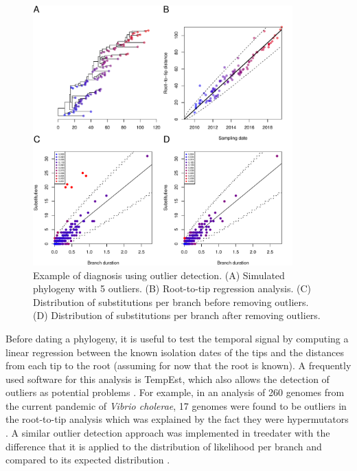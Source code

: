 \documentclass{article}
\begin{document}
\begin{figure}[p!]
\begin{center}
\includegraphics[width=10cm]{outlier.pdf}
\end{center}
\caption{Example of diagnosis using outlier detection.
(A) Simulated phylogeny with 5 outliers. 
(B) Root-to-tip regression analysis.
(C) Distribution of substitutions per branch before removing outliers.
(D) Distribution of substitutions per branch after removing outliers.
\label{fig:outlier}}
\end{figure}

Before dating a phylogeny, it is useful to test the temporal signal by computing a linear regression
between the known isolation dates of the tips and the distances from each tip to the root 
(assuming for now that the root is known). A frequently used software for this analysis is TempEst,
which also allows the detection of outliers as potential problems \citep{Rambaut2016a}. 
For example, in an analysis of 260 genomes from the current pandemic of \textit{Vibrio cholerae},
17 genomes were found to be outliers in the root-to-tip analysis which was 
explained by the fact they were hypermutators \citep{Didelot2015}. A similar outlier detection
approach was implemented in treedater with the difference that it is 
applied to the distribution of likelihood per branch and compared to its expected distribution \citep{Volz2017}.
\end{document}
